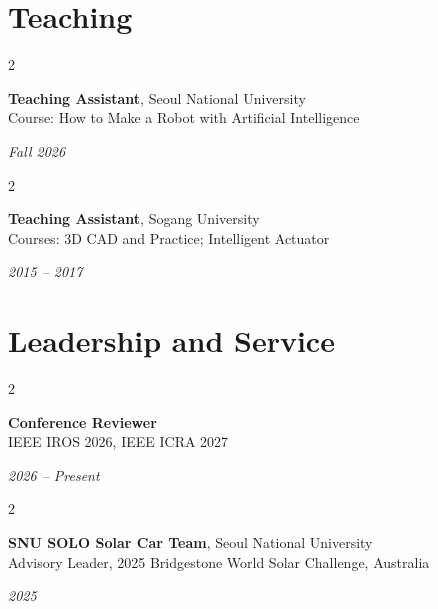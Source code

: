 \documentclass[10pt, letterpaper]{article}
\newenvironment{twocolentry}[2][]{
    \onecolentry
    \def\secondColumn{#2}
    \setcolumnwidth{\fill, 4.5 cm}
    \begin{paracol}{2}
}{
    \switchcolumn \raggedleft \secondColumn
    \end{paracol}
    \endonecolentry
} %
\begin{document}
\section{Teaching}
\begin{twocolentry}{\textit{Fall 2026}}
\textbf{Teaching Assistant}, Seoul National University\\
Course: How to Make a Robot with Artificial Intelligence
\end{twocolentry}

\vspace{0.2 cm}

\begin{twocolentry}{\textit{2015 -- 2017}}
\textbf{Teaching Assistant}, Sogang University\\
Courses: 3D CAD and Practice; Intelligent Actuator
\end{twocolentry}

\section{Leadership and Service}
\begin{twocolentry}{\textit{2026 -- Present}}
\textbf{Conference Reviewer}\\
IEEE IROS 2026, IEEE ICRA 2027
\end{twocolentry}

\vspace{0.2 cm}

\begin{twocolentry}{\textit{2025}}
\textbf{SNU SOLO Solar Car Team}, Seoul National University\\
Advisory Leader, 2025 Bridgestone World Solar Challenge, Australia
\end{twocolentry}
\end{document}
